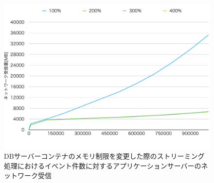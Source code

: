 \documentclass[../../../../../main]{subfiles}
\begin{document}
    \begin{figure}[H]
        \centering
        \includegraphics[width=12cm]{graph}
        \caption{DBサーバーコンテナのメモリ制限を変更した際のストリーミング処理におけるイベント件数に対するアプリケーションサーバーのネットワーク受信}
        \label{fig:stream-change-db-memory-limit-app-net-in-app_4_8192-db_400}
    \end{figure}
\end{document}
